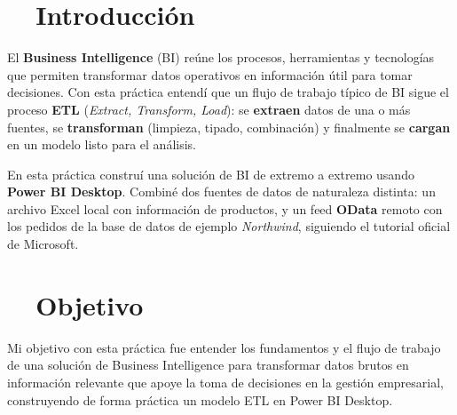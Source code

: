 \documentclass[11pt,a4paper]{article}
\begin{document}
\tableofcontents
\thispagestyle{fancy}
\newpage

\section{\faLightbulb\ \ Introducción}
El \textbf{Business Intelligence} (BI) reúne los procesos, herramientas y tecnologías que permiten transformar datos operativos en información útil para tomar decisiones. Con esta práctica entendí que un flujo de trabajo típico de BI sigue el proceso \textbf{ETL} (\textit{Extract, Transform, Load}): se \textbf{extraen} datos de una o más fuentes, se \textbf{transforman} (limpieza, tipado, combinación) y finalmente se \textbf{cargan} en un modelo listo para el análisis.

En esta práctica construí una solución de BI de extremo a extremo usando \textbf{Power BI Desktop}. Combiné dos fuentes de datos de naturaleza distinta: un archivo Excel local con información de productos, y un feed \textbf{OData} remoto con los pedidos de la base de datos de ejemplo \textit{Northwind}, siguiendo el tutorial oficial de Microsoft.

\section{\faBullseye\ \ Objetivo}
\begin{objetivobox}
Mi objetivo con esta práctica fue entender los fundamentos y el flujo de trabajo de una solución de Business Intelligence para transformar datos brutos en información relevante que apoye la toma de decisiones en la gestión empresarial, construyendo de forma práctica un modelo ETL en Power BI Desktop.
\end{objetivobox}

\end{document}

